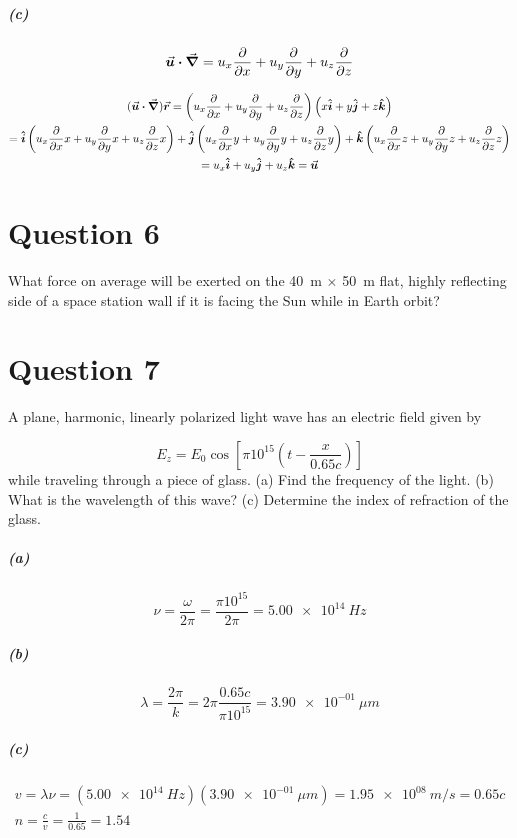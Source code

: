 \documentclass[a4paper]{article}
\begin{document}
\subparagraph*{(c)}

\[
    \va*{u} \vdot \grad = u_x \pdv{x} + u_y \pdv{y} + u_z \pdv{z}
\]

\begin{gather*}
    (\va*{u} \vdot \grad) \va*{r} = \left(u_x \pdv{x} + u_y \pdv{y} + u_z \pdv{z} \right) \left(x\vu*{i} + y\vu*{j} + z\vu*{k} \right) \\
     = \vu*{i} \left(u_x \pdv{x} x  + u_y \pdv{y} x + u_z \pdv{z} x \right) + \vu*{j} \left(u_x \pdv{x} y  + u_y \pdv{y} y + u_z \pdv{z} y \right) + \vu*{k} \left(u_x \pdv{x} z  + u_y \pdv{y} z + u_z \pdv{z} z \right) \\
     = u_x \vu*{i} + u_y \vu*{j} + u_z \vu*{k} = \va*{u}
\end{gather*}

\section*{Question 6}
What force on average will be exerted on the \qty{40}{m} $\times$ \qty{50}{m} flat, highly reflecting side of a space
station wall if it is facing the Sun while in Earth orbit?

\section*{Question 7}
A plane, harmonic, linearly polarized light wave has an electric field given by

\[
    E_z = E_0 \cos\left[\pi 10^{15} \left(t - \frac{x}{0.65 c} \right) \right]
\]
while traveling through a piece of glass. (a) Find the frequency of the light. (b) What is the wavelength
of this wave? (c) Determine the index of refraction of the glass. 

\subparagraph*{(a)}

\[
    \nu = \frac{\omega}{2 \pi} = \frac{\pi 10^{15}}{2 \pi} = \qty{5.00e+14}{Hz}
\]

\subparagraph*{(b)}

\[
    \lambda = \frac{2 \pi}{k} = 2 \pi \frac{0.65 c}{\pi 10^{15}} = \qty{3.90e-01}{\mu m}
\]

\subparagraph*{(c)}

\begin{gather*}
    v = \lambda \nu = (\qty{5.00e+14}{Hz}) (\qty{3.90e-01}{\mu m}) = \qty{1.95e+08}{m \per s} = 0.65 c \\
    n = \frac{c}{v} = \frac{1}{0.65} = 1.54
\end{gather*}
\end{document}

